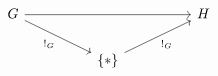 \[\begin{tikzcd}
	G &&&& H \\
	&& {\{*\}}
	\arrow["{!_{G}}"', from=1-1, to=2-3]
	\arrow["{!_{G}}"', from=2-3, to=1-5]
	\arrow[from=1-1, to=1-5]
\end{tikzcd}\]